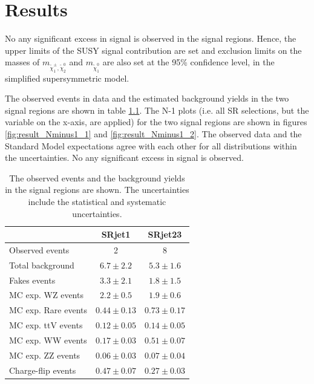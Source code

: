 \chapter{Results}
\label{ch:result}

No any significant excess in signal is observed in the signal regions.
Hence, the upper limits of the SUSY signal contribution are set and exclusion limits on the masses of $m_{\tilde{\chi}_1^\pm, \tilde{\chi}_2^0}$ and $m_{\tilde{\chi}_1^0}$ are also set at the 95\% confidence level, in the simplified supersymmetric model.

The observed events in data and the estimated background yields in the two signal regions are shown in table \ref{tab:result_SR_result}.
The N-1 plots (i.e. all SR selections, but the variable on the x-axis, are applied) for the two signal regions are shown in figures \ref{fig:result_Nminus1_1} and \ref{fig:result_Nminus1_2}.
The observed data and the Standard Model expectations agree with each other for all distributions within the uncertainties.
No any significant excess in signal is observed.

\begin{table}[htbp]
\begin{center}
\begin{tabular}{|l|c|c|}
\hline
 & SRjet1 & SRjet23 \\
\hline
\hline
Observed events & 2 & 8 \\
\hline
Total background    & $6.7  \pm 2.2$  & $5.3  \pm 1.6$  \\
\hline
Fakes events        & $3.3  \pm 2.1$  & $1.8  \pm 1.5$  \\
MC exp. WZ events   & $2.2  \pm 0.5$  & $1.9  \pm 0.6$  \\
MC exp. Rare events & $0.44 \pm 0.13$ & $0.73 \pm 0.17$ \\
MC exp. ttV events  & $0.12 \pm 0.05$ & $0.14 \pm 0.05$ \\
MC exp. WW events   & $0.17 \pm 0.03$ & $0.51 \pm 0.07$ \\
MC exp. ZZ events   & $0.06 \pm 0.03$ & $0.07 \pm 0.04$ \\
Charge-flip events  & $0.47 \pm 0.07$ & $0.27 \pm 0.03$ \\
\hline
\end{tabular}
\caption{The observed events and the background yields in the signal regions are shown. The uncertainties include the statistical and systematic uncertainties.}
\label{tab:result_SR_result}
\end{center}
\end{table}

